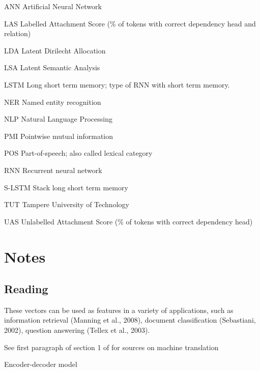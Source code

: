\documentclass[12pt,a4paper,english
]{tutthesis}
\begin{document}
\begin{termlist}
\item[ANN] Artificial Neural Network
\item[LAS] Labelled Attachment Score (\% of tokens with correct dependency head and relation)
\item[LDA] Latent Dirilecht Allocation
\item[LSA] Latent Semantic Analysis
\item[LSTM] Long short term memory; type of RNN with short term memory.
\item[NER] Named entity recognition
\item[NLP] Natural Language Processing
\item[PMI] Pointwise mutual information
\item[POS] Part-of-speech; also called lexical category
\item[RNN] Recurrent neural network
\item[S-LSTM] Stack long short term memory
\item[TUT] Tampere University of Technology
\item[UAS] Unlabelled Attachment Score (\% of tokens with correct dependency head)
\end{termlist}


\chapter*{Notes}

\section{Reading}
These vectors can be used as features in a variety of applications, such as information retrieval (Manning et al., 2008), document classification (Sebastiani, 2002), question answering (Tellex et al., 2003). \cite{Pennington2014}

See first paragraph of section 1 of \cite{Liang2016a} for sources on machine translation

Encoder-decoder model
\end{document}
